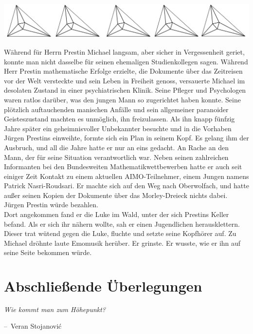 \documentclass[oneside]{memoir}
\makeatletter
\newcommand{\parasep}{
\bigskip
\bigskip
\begin{center} 
   \includegraphics[scale=.08]{parasep5.jpg} 
\end{center}
\bigskip
\bigskip
}
\newenvironment{chapquote}[2][2em]
  {\setlength{\@tempdima}{#1}%
   \def\chapquote@author{#2}%
   \parshape 1 \@tempdima \dimexpr\textwidth-2\@tempdima\relax%
   \itshape}
  {\par\normalfont\hfill--\ \chapquote@author\hspace*{\@tempdima}\par\bigskip}
\makeatother
\begin{document}
\parasep

\noindent Während für Herrn Prestin Michael langsam, aber sicher in Vergessenheit geriet, konnte man nicht dasselbe für seinen ehemaligen Studienkollegen sagen. Während Herr Prestin mathematische Erfolge erzielte, die Dokumente über das Zeitreisen vor der Welt versteckte und sein Leben in Freiheit genoss, versauerte Michael im desolaten Zustand in einer psychiatrischen Klinik. Seine Pfleger und Psychologen waren ratlos darüber, was den jungen Mann so zugerichtet haben konnte. Seine plötzlich auftauchenden manischen Anfälle und sein allgemeiner paranoider Geisteszustand machten es unmöglich, ihn freizulassen. Als ihn knapp fünfzig Jahre später ein geheimnisvoller Unbekannter besuchte und in die Vorhaben Jürgen Prestins einweihte, formte sich ein Plan in seinem Kopf. Es gelang ihm der Ausbruch, und all die Jahre hatte er nur an eins gedacht. An Rache an den Mann, der für seine Situation verantwortlich war. Neben seinen zahlreichen Informanten bei den Bundesweiten Mathematikwettbewerben hatte er auch seit einiger Zeit Kontakt zu einem aktuellen AIMO-Teilnehmer, einem Jungen namens Patrick Nasri-Roudsari. Er  machte sich auf den Weg nach Oberwolfach, und hatte außer seinen Kopien der Dokumente über das Morley-Dreieck nichts dabei. Jürgen Prestin würde bezahlen. \\
Dort angekommen fand er die Luke im Wald, unter der sich Prestins Keller befand. Als er sich ihr nähern wollte, sah er einen Jugendlichen herausklettern. Dieser trat wütend gegen die Luke, fluchte und setzte seine Kopfhörer auf. Zu Michael dröhnte laute Emomusik herüber. Er grinste. Er wusste, wie er ihn auf seine Seite bekommen würde.

\chapter{Abschließende Überlegungen} %
\begin{chapquote}{Veran Stojanović}
\glqq Wie kommt man zum Höhepunkt?\grqq
\end{chapquote}
\end{document}
